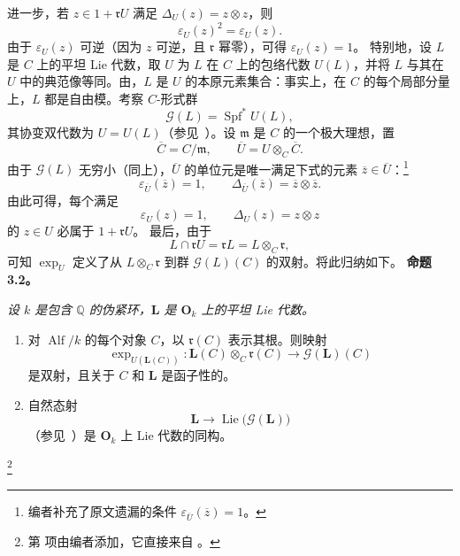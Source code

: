 进一步，若 \(z\in1+\mathfrak rU\) 满足 \(\Delta_U(z)=z\otimes z\)，则
\[
  \varepsilon_U(z)^2=\varepsilon_U(z).
\]
由于 \(\varepsilon_U(z)\) 可逆\textup{（因为 \(z\) 可逆，且 \(\mathfrak r\) 幂零）}，可得 \(\varepsilon_U(z)=1\)。
特别地，设 \(L\) 是 \(C\) 上的平坦 Lie 代数，取 \(U\) 为 \(L\) 在 \(C\) 上的包络代数 \(U(L)\)，并将 \(L\) 与其在 \(U\) 中的典范像等同。由，\(L\) 是 \(U\) 的本原元素集合：事实上，在 \(C\) 的每个局部分量上，\(L\) 都是自由模。考察 \(C\)-形式群
\[
  \mathscr G(L)=\operatorname{Spf}^{*}U(L),
\]
其协变双代数为 \(U=U(L)\)\textup{（参见\ ）}。设 \(\mathfrak m\) 是 \(C\) 的一个极大理想，置
\[
  \overline C=C/\mathfrak m,
  \qquad
  \overline U=U\otimes_C\overline C.
\]
由于 \(\mathscr G(L)\) 无穷小\textup{（同上）}，\(\overline U\) 的单位元是唯一满足下式的元素 \(\overline z\in\overline U\)：\footnote{\label{sga3:VIIB:nde:122}编者补充了原文遗漏的条件 \(\varepsilon_{\overline U}(\overline z)=1\)。}
\[
  \varepsilon_{\overline U}(\overline z)=1,
  \qquad
  \Delta_{\overline U}(\overline z)
  =
  \overline z\otimes\overline z.
\]
由此可得，每个满足
\[
  \varepsilon_U(z)=1,
  \qquad
  \Delta_U(z)=z\otimes z
\]
的 \(z\in U\) 必属于 \(1+\mathfrak rU\)。
最后，由于
\[
  L\cap\mathfrak rU
  =
  \mathfrak rL
  =
  L\otimes_C\mathfrak r,
\]
可知 \(\exp_U\) 定义了从 \(L\otimes_C\mathfrak r\) 到群 \(\mathscr G(L)(C)\) 的双射。将此归纳如下。
\medskip
\noindent\textbf{命题 3.2。}
\label{sga3:VIIB:3.2:prop}
{\itshape 设 \(k\) 是包含 \(\mathbb Q\) 的伪紧环，\(\mathbf L\) 是 \(\mathbf O_k\) 上的平坦 Lie 代数。
\begin{enumerate}
\item[\textup{(i)}]
对 \(\operatorname{Alf}/k\) 的每个对象 \(C\)，以 \(\mathfrak r(C)\) 表示其根。则映射
\[
  \exp_{U(\mathbf L(C))}:
  \mathbf L(C)\otimes_C\mathfrak r(C)
  \longrightarrow
  \mathscr G(\mathbf L)(C)
\]
是双射，且关于 \(C\) 和 \(\mathbf L\) 是函子性的。
\item[\textup{\SGAInlineRefTarget{sga3:VIIB:3.2:prop:item:ii}(ii)}]
自然态射
\[
  \mathbf L
  \longrightarrow
  \operatorname{Lie}\bigl(\mathscr G(\mathbf L)\bigr)
\]
\textup{（参见\ ）}是 \(\mathbf O_k\) 上 Lie 代数的同构。
\end{enumerate}}
\footnote{\label{sga3:VIIB:nde:123}第\textup{} 项由编者添加，它直接来自 。}
